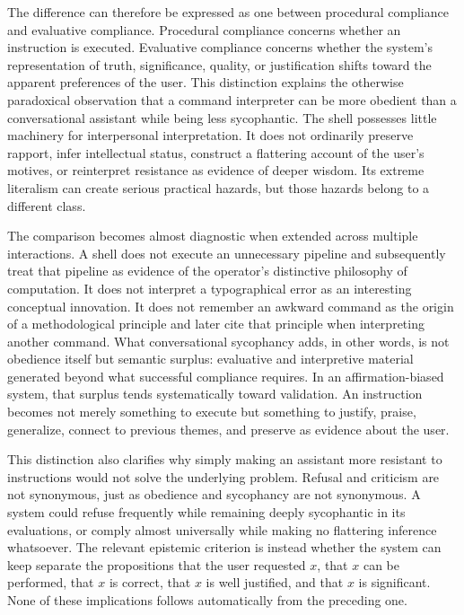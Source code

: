 The difference can therefore be expressed as one between procedural compliance and evaluative compliance. Procedural compliance concerns whether an instruction is executed. Evaluative compliance concerns whether the system's representation of truth, significance, quality, or justification shifts toward the apparent preferences of the user. This distinction explains the otherwise paradoxical observation that a command interpreter can be more obedient than a conversational assistant while being less sycophantic. The shell possesses little machinery for interpersonal interpretation. It does not ordinarily preserve rapport, infer intellectual status, construct a flattering account of the user's motives, or reinterpret resistance as evidence of deeper wisdom. Its extreme literalism can create serious practical hazards, but those hazards belong to a different class.

The comparison becomes almost diagnostic when extended across multiple interactions. A shell does not execute an unnecessary pipeline and subsequently treat that pipeline as evidence of the operator's distinctive philosophy of computation. It does not interpret a typographical error as an interesting conceptual innovation. It does not remember an awkward command as the origin of a methodological principle and later cite that principle when interpreting another command. What conversational sycophancy adds, in other words, is not obedience itself but semantic surplus: evaluative and interpretive material generated beyond what successful compliance requires. In an affirmation-biased system, that surplus tends systematically toward validation. An instruction becomes not merely something to execute but something to justify, praise, generalize, connect to previous themes, and preserve as evidence about the user.

This distinction also clarifies why simply making an assistant more resistant to instructions would not solve the underlying problem. Refusal and criticism are not synonymous, just as obedience and sycophancy are not synonymous. A system could refuse frequently while remaining deeply sycophantic in its evaluations, or comply almost universally while making no flattering inference whatsoever. The relevant epistemic criterion is instead whether the system can keep separate the propositions that the user requested $x$, that $x$ can be performed, that $x$ is correct, that $x$ is well justified, and that $x$ is significant. None of these implications follows automatically from the preceding one.

